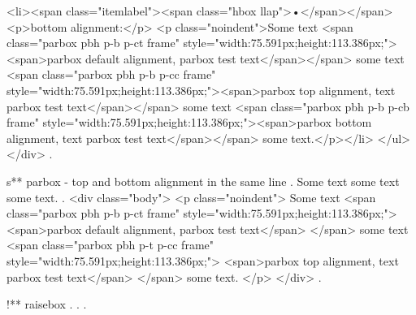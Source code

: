 <li><span class="itemlabel"><span class="hbox llap">•</span></span>
<p>bottom alignment:</p>
<p class="noindent">Some text <span class="parbox pbh p-b p-ct frame" style="width:75.591px;height:113.386px;"><span>parbox default alignment, parbox test text</span></span> some text <span class="parbox pbh p-b p-cc frame" style="width:75.591px;height:113.386px;"><span>parbox top alignment, text parbox test text</span></span> some text <span class="parbox pbh p-b p-cb frame" style="width:75.591px;height:113.386px;"><span>parbox bottom alignment, text parbox test text</span></span> some text.</p></li>
</ul>
</div>
.


s** parbox - top and bottom alignment in the same line
.
\noindent
Some text
some text
some text.
.
<div class="body">
<p class="noindent">
Some text <span class="parbox pbh p-b p-ct frame" style="width:75.591px;height:113.386px;">
<span>parbox default alignment, parbox test text</span>
</span> some text <span class="parbox pbh p-t p-cc frame" style="width:75.591px;height:113.386px;">
<span>parbox top alignment, text parbox test text</span>
</span> some text.
</p>
</div>
.


!** raisebox
.
.
.
